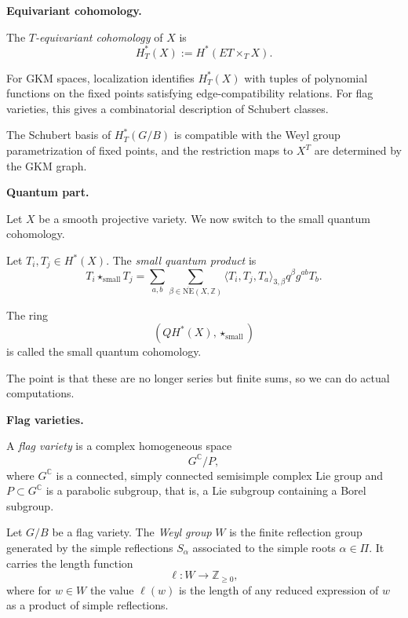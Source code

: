 \medskip\noindent
{\bf Equivariant cohomology.}

\begin{definition}
\label{definition-t-equivariant}
The {\it $T$-equivariant cohomology}
of $X$ is
\[
H_T^*(X):=
H^*(ET\times_T X).
\]
\end{definition}

For GKM spaces, localization identifies
$H_T^*(X)$ with tuples of polynomial
functions on the fixed points satisfying
edge-compatibility relations.
For flag varieties, this gives a
combinatorial description of
Schubert classes.

\begin{proposition}
\label{proposition-schubert-basis}
The Schubert basis of $H_T^*(G/B)$ is
compatible with the Weyl group
parametrization of fixed points, and the
restriction maps to $X^T$ are determined
by the GKM graph.
\end{proposition}

\medskip\noindent
{\bf Quantum part.}

Let $X$ be a smooth projective variety.
We now switch to the small quantum
cohomology.

\begin{definition}
\label{definition-let-t}
Let $T_i,T_j\in H^*(X)$.
The {\it small quantum product} is
\[
T_i\star_{\mathrm{small}}T_j
=
\sum_{a,b}
\sum_{\beta\in \overline{\mathrm{NE}}
(X,\mathbb{Z})}
\langle T_i,T_j,T_a\rangle_{3,\beta}
q^\beta g^{ab}T_b.
\]
\end{definition}

The ring
\[
(QH^*(X),\star_{\mathrm{small}})
\]
is called the small quantum cohomology.

The point is that these are no longer
series but finite sums, so we can do
actual computations.

\medskip\noindent
{\bf Flag varieties.}

\begin{definition}
\label{definition-flag-variety}
A {\it flag variety} is a complex
homogeneous space
\[
G^{\mathbb{C}}/P,
\]
where $G^{\mathbb{C}}$ is a connected,
simply connected semisimple complex Lie
group and $P\subset G^{\mathbb{C}}$ is a
parabolic subgroup, that is, a Lie
subgroup containing a Borel subgroup.
\end{definition}

\begin{definition}
\label{definition-let-g2}
Let $G/B$ be a flag variety.
The {\it Weyl group} $W$ is the finite
reflection group generated by the simple
reflections $S_\alpha$ associated to
the simple roots $\alpha\in \Pi$.
It carries the length function
\[
\ell:W\to \mathbb{Z}_{\geq 0},
\]
where for $w\in W$ the value $\ell(w)$
is the length of any reduced expression
of $w$ as a product of simple
reflections.
\end{definition}

